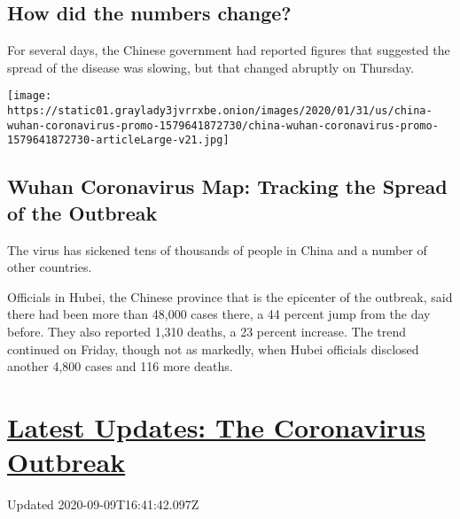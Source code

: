 \hypertarget{how-did-the-numbers-change}{%
\subsection{How did the numbers
change?}\label{how-did-the-numbers-change}}

For several days, the Chinese government had reported figures that
suggested the spread of the disease was slowing, but that changed
abruptly on Thursday.

\href{https://www.nytimes3xbfgragh.onion/interactive/2020/01/21/world/asia/china-coronavirus-maps.html}{}

\texttt{[image: https://static01.graylady3jvrrxbe.onion/images/2020/01/31/us/china-wuhan-coronavirus-promo-1579641872730/china-wuhan-coronavirus-promo-1579641872730-articleLarge-v21.jpg]}

\hypertarget{wuhan-coronavirus-map-tracking-the-spread-of-the-outbreak}{%
\subsection{Wuhan Coronavirus Map: Tracking the Spread of the
Outbreak}\label{wuhan-coronavirus-map-tracking-the-spread-of-the-outbreak}}

The virus has sickened tens of thousands of people in China and a number
of other countries.

Officials in Hubei, the Chinese province that is the epicenter of the
outbreak, said there had been more than 48,000 cases there, a 44 percent
jump from the day before. They also reported 1,310 deaths, a 23 percent
increase. The trend continued on Friday, though not as markedly, when
Hubei officials disclosed another 4,800 cases and 116 more deaths.

\hypertarget{latest-updates-the-coronavirus-outbreak}{%
\section{\texorpdfstring{\href{https://www.nytimes3xbfgragh.onion/2020/09/09/world/covid-19-coronavirus.html?action=click\&pgtype=Article\&state=default\&region=MAIN_CONTENT_1\&context=storylines_live_updates}{Latest
Updates: The Coronavirus
Outbreak}}{Latest Updates: The Coronavirus Outbreak}}\label{latest-updates-the-coronavirus-outbreak}}

Updated 2020-09-09T16:41:42.097Z

